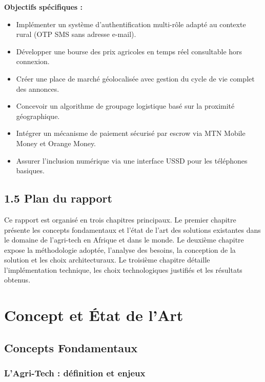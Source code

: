 \documentclass[12pt,a4paper]{report}
\begin{document}
\textbf{Objectifs spécifiques :}

\begin{itemize}
  \item Implémenter un système d'authentification multi-rôle adapté au contexte rural (OTP SMS sans adresse e-mail).
  \item Développer une bourse des prix agricoles en temps réel consultable hors connexion.
  \item Créer une place de marché géolocalisée avec gestion du cycle de vie complet des annonces.
  \item Concevoir un algorithme de groupage logistique basé sur la proximité géographique.
  \item Intégrer un mécanisme de paiement sécurisé par escrow via MTN Mobile Money et Orange Money.
  \item Assurer l'inclusion numérique via une interface USSD pour les téléphones basiques.
\end{itemize}

\section*{1.5 Plan du rapport}

Ce rapport est organisé en trois chapitres principaux. Le premier chapitre présente les concepts fondamentaux et l'état de l'art des solutions existantes dans le domaine de l'agri-tech en Afrique et dans le monde. Le deuxième chapitre expose la méthodologie adoptée, l'analyse des besoins, la conception de la solution et les choix architecturaux. Le troisième chapitre détaille l'implémentation technique, les choix technologiques justifiés et les résultats obtenus.

\chapter{Concept et État de l'Art}

\section{Concepts Fondamentaux}

\subsection{L'Agri-Tech : définition et enjeux}
\end{document}

